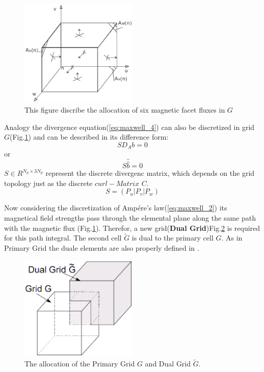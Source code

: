 \begin{figure}
\centering
\includegraphics[width=0.5\textwidth]{bilder/divergence_in_grid}
\caption{This figure discribe the allocation of six magnetic facet fluxes in $G$}
\label{fig:divergence_G}
\end{figure}
Analogy the divergence equation(\ref{eq:maxwell_4}) can also be discretized in grid $G$(Fig.\ref{fig:divergence_G}) and can be described in its difference form: 
\begin{equation}
SD_{A}b=0
\label{eq:divergence_sample}
\end{equation}
or
\begin{equation}
S\widehat{\widehat{b}}=0
\label{eq:divergence_integral}
\end{equation}
$S\in R^{N_{p}\times 3N_{p}}$ represent the discrete divergenc matrix, which depends on the grid topology just as the discrete $curl-Matrix$ $C$.
\begin{equation}
S=(P_{u}|P_{v}|P_{w})
\label{eq:S_matrix}
\end{equation}


Now considering the discretization of Amp\'ere's law(\ref{eq:maxwell_2}) its magnetical field strengths pass through the elemental plane along the same path with the magnetic flux (Fig.\ref{fig:divergence_G}). Therefor, a new grid(\textbf{Dual Grid})Fig.\ref{fig:dual_grid} is required for this path integral. The second cell $\tilde{G}$ is dual to the primary cell $G$. As in Primary Grid the duale elements are also properly defined in \cite{script_FeldSim}.

\begin{figure}
\centering
\includegraphics[width=0.5\textwidth]{bilder/dual_grid}
\caption{The allocation of the Primary Grid $G$ and Dual Grid $\tilde{G}$.}
\label{fig:dual_grid}
\end{figure}

